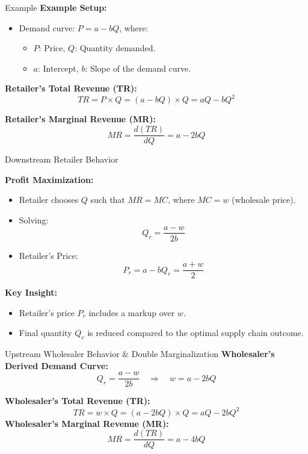 \documentclass[aspectratio=169]{beamer}  %
\begin{document}
\begin{frame}{Example}
    \textbf{Example Setup:}
    \begin{itemize}
        \item Demand curve: \( P = a - bQ \), where:
        \begin{itemize}
            \item \( P \): Price, \( Q \): Quantity demanded.
            \item \( a \): Intercept, \( b \): Slope of the demand curve.
        \end{itemize}
    \end{itemize}

    \textbf{Retailer’s Total Revenue (TR):}
    \[
    TR = P \times Q = (a - bQ) \times Q = aQ - bQ^2
    \]

    \vspace{0.3cm}
    \textbf{Retailer’s Marginal Revenue (MR):}
    \[
    MR = \frac{d(TR)}{dQ} = a - 2bQ
    \]
\end{frame}

\begin{frame}{Downstream Retailer Behavior}
    
    \textbf{Profit Maximization:}
    \begin{itemize}
        \item Retailer chooses \( Q \) such that \( MR = MC \), where \( MC = w \) (wholesale price).
        \item Solving:
        \[
        Q_r = \frac{a - w}{2b}
        \]
        \item Retailer’s Price:
        \[
        P_r = a - bQ_r = \frac{a + w}{2}
        \]
    \end{itemize}

    \vspace{0.3cm}
    \textbf{Key Insight:}
    \begin{itemize}
        \item Retailer’s price \( P_r \) includes a markup over \( w \).
        \item Final quantity \( Q_r \) is reduced compared to the optimal supply chain outcome.
    \end{itemize}
\end{frame}

\begin{frame}{Upstream Wholesaler Behavior \& Double Marginalization}
    \textbf{Wholesaler’s Derived Demand Curve:}
    \[
    Q_r = \frac{a - w}{2b} \quad \Rightarrow \quad w = a - 2bQ
    \]

    \textbf{Wholesaler’s Total Revenue (TR):}
    \[
    TR = w \times Q = (a - 2bQ) \times Q = aQ - 2bQ^2
    \]
    \textbf{Wholesaler’s Marginal Revenue (MR):}
    \[
    MR = \frac{d(TR)}{dQ} = a - 4bQ
    \]

\end{frame}
\end{document}
